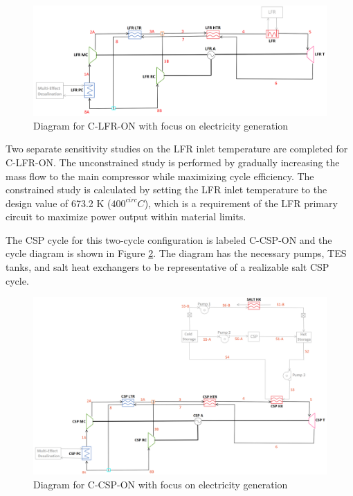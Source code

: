 \begin{figure}[H] 
    \widefigure
    \includegraphics[width=\linewidth]{Definitions/c-lfr-on.pdf}
    \caption{Diagram for C-LFR-ON with focus on electricity generation\label{c-lfr-on}}
\end{figure}
\begin{paracol}{2}
\linenumbers
\switchcolumn

Two separate sensitivity studies on the LFR inlet temperature are completed for C-LFR-ON. The unconstrained study is performed by gradually increasing the mass flow to the main compressor while maximizing cycle efficiency. The constrained study is calculated by setting the LFR inlet temperature to the design value of 673.2 K ($400^{circ}C$), which is a requirement of the LFR primary circuit to maximize power output within material limits.

The CSP cycle for this two-cycle configuration is labeled C-CSP-ON and the cycle diagram is shown in Figure \ref{c-csp-on}. The diagram has the necessary pumps, TES tanks, and salt heat exchangers to be representative of a realizable salt CSP cycle.

\end{paracol}
\begin{figure}[H] 
    \widefigure
    \includegraphics[width=\linewidth]{Definitions/c-csp-on.pdf}
    \caption{Diagram for C-CSP-ON with focus on electricity generation\label{c-csp-on}}
\end{figure}
